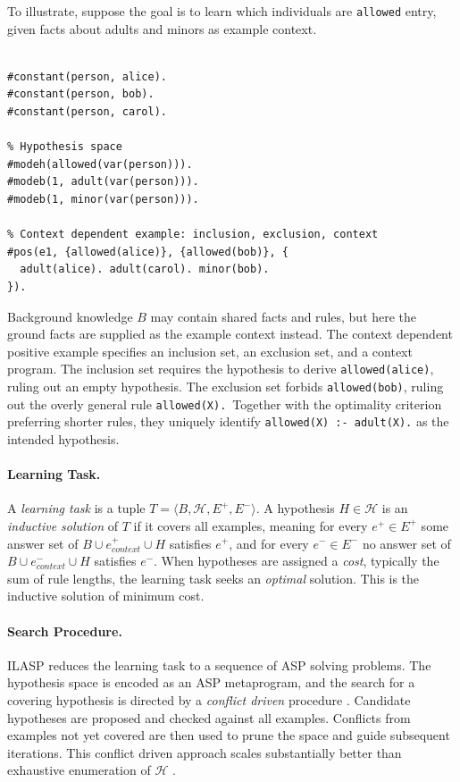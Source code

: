 \documentclass[11pt,a4paper]{article}
\begin{document}
To illustrate, suppose the goal is to learn which individuals are \texttt{allowed} entry, given facts about adults and minors as example context.

\begin{lstlisting}[language=ASP, caption={Simple ILASP learning task.}]
% Background knowledge B, could contain shared facts and rules

#constant(person, alice).
#constant(person, bob).
#constant(person, carol).

% Hypothesis space
#modeh(allowed(var(person))).
#modeb(1, adult(var(person))).
#modeb(1, minor(var(person))).

% Context dependent example: inclusion, exclusion, context
#pos(e1, {allowed(alice)}, {allowed(bob)}, {
  adult(alice). adult(carol). minor(bob).
}).
\end{lstlisting}

Background knowledge $B$ may contain shared facts and rules, but here the ground facts are supplied as the example context instead. The context dependent positive example specifies an inclusion set, an exclusion set, and a context program. The inclusion set requires the hypothesis to derive \texttt{allowed(alice)}, ruling out an empty hypothesis. The exclusion set forbids \texttt{allowed(bob)}, ruling out the overly general rule \texttt{allowed(X).}\ Together with the optimality criterion preferring shorter rules, they uniquely identify \texttt{allowed(X) :- adult(X).} as the intended hypothesis.

\paragraph{Learning Task.}
A \textit{learning task} is a tuple $T = \langle B, \mathcal{H}, E^+, E^- \rangle$. A hypothesis $H \in \mathcal{H}$ is an \textit{inductive solution} of $T$ if it covers all examples, meaning for every $e^+ \in E^+$ some answer set of $B \cup e^+_\mathit{context} \cup H$ satisfies $e^+$, and for every $e^- \in E^-$ no answer set of $B \cup e^-_\mathit{context} \cup H$ satisfies $e^-$. When hypotheses are assigned a \textit{cost}, typically the sum of rule lengths, the learning task seeks an \textit{optimal} solution. This is the inductive solution of minimum cost.

\paragraph{Search Procedure.}
ILASP reduces the learning task to a sequence of ASP solving problems. The hypothesis space is encoded as an ASP metaprogram, and the search for a covering hypothesis is directed by a \textit{conflict driven} procedure \cite{law2020ilaspinductivelearninganswer}. Candidate hypotheses are proposed and checked against all examples. Conflicts from examples not yet covered are then used to prune the space and guide subsequent iterations. This conflict driven approach scales substantially better than exhaustive enumeration of $\mathcal{H}$ \cite{law2022conflictdriveninductivelogicprogramming}.
\end{document}
